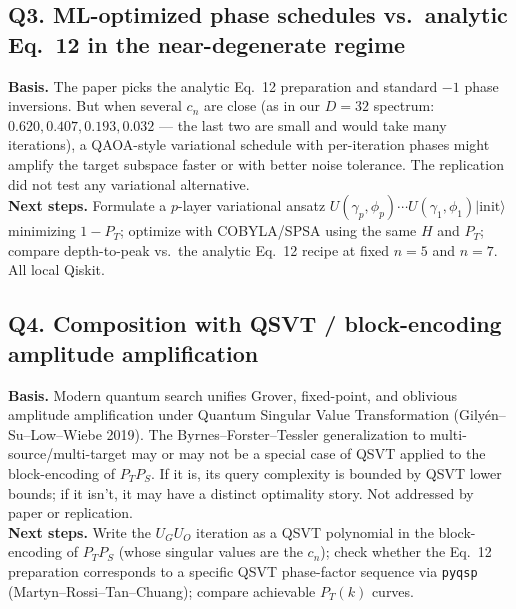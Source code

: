 \subsection*{Q3. ML-optimized phase schedules vs.\ analytic Eq.~12 in the near-degenerate regime}
\textbf{Basis.} The paper picks the analytic Eq.~12 preparation and standard $-1$
phase inversions. But when several $c_n$ are close (as in our $D=32$ spectrum:
$0.620, 0.407, 0.193, 0.032$ --- the last two are small and would take many
iterations), a QAOA-style variational schedule with per-iteration phases might
amplify the target subspace faster or with better noise tolerance. The
replication did not test any variational alternative.\\
\textbf{Next steps.} Formulate a $p$-layer variational ansatz
$U(\gamma_p, \phi_p)\cdots U(\gamma_1, \phi_1)|\mathrm{init}\rangle$ minimizing
$1 - P_T$; optimize with COBYLA/SPSA using the same $H$ and $P_T$; compare
depth-to-peak vs.\ the analytic Eq.~12 recipe at fixed $n=5$ and $n=7$. All
local Qiskit.

\subsection*{Q4. Composition with QSVT / block-encoding amplitude amplification}
\textbf{Basis.} Modern quantum search unifies Grover, fixed-point, and oblivious
amplitude amplification under Quantum Singular Value Transformation
(Gily\'en--Su--Low--Wiebe 2019). The Byrnes--Forster--Tessler generalization to
multi-source/multi-target may or may not be a special case of QSVT applied to the
block-encoding of $P_T P_S$. If it is, its query complexity is bounded by QSVT
lower bounds; if it isn't, it may have a distinct optimality story. Not addressed
by paper or replication.\\
\textbf{Next steps.} Write the $U_G U_O$ iteration as a QSVT polynomial in the
block-encoding of $P_T P_S$ (whose singular values are the $c_n$); check whether
the Eq.~12 preparation corresponds to a specific QSVT phase-factor sequence via
\texttt{pyqsp} (Martyn--Rossi--Tan--Chuang); compare achievable $P_T(k)$ curves.

